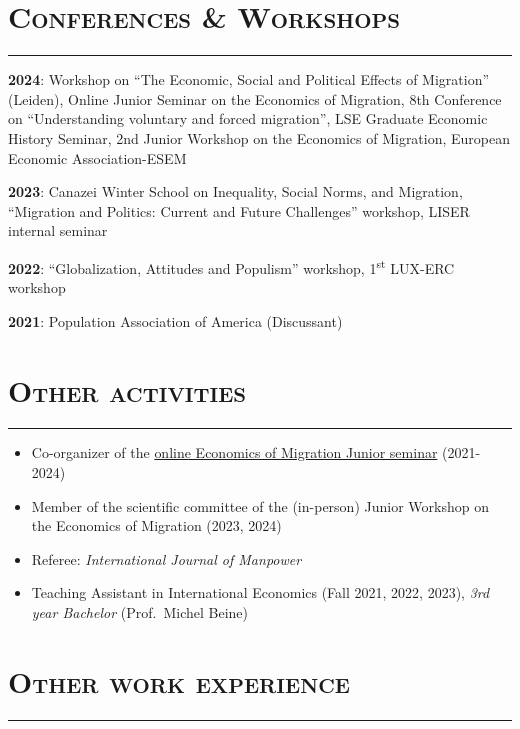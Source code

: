 \documentclass{article}
\newcommand{\sectionline}{%
  \vspace{-0.6cm}%
  \par\noindent\rule{\textwidth}{0.4pt}%
}
\let\xsection=\section
\renewcommand{\section}[1]{%
  \vspace{0.1cm}%
  \xsection*{\scshape{#1}}%
  \sectionline%
}
\begin{document}
\hypertarget{conferences-workshops}{%
\section{Conferences \& Workshops}\label{conferences-workshops}}

\textbf{2024}: Workshop on ``The Economic, Social and Political Effects of Migration'' (Leiden), Online Junior Seminar on the Economics of Migration, 8th Conference on ``Understanding voluntary and forced migration'', LSE Graduate Economic History Seminar, 2nd Junior Workshop on the Economics of Migration, European Economic Association-ESEM 

\textbf{2023}: Canazei Winter School on Inequality, Social Norms, and
Migration, ``Migration and Politics: Current and Future Challenges''
workshop, LISER internal seminar

\textbf{2022}: ``Globalization, Attitudes and Populism'' workshop,
1\textsuperscript{st} LUX-ERC workshop

\textbf{2021}: Population Association of America (Discussant)

\hypertarget{relevant-activities}{%
\section{Other activities}\label{relevant-activities}}

\begin{itemize}

\item
  Co-organizer of the
  \href{https://sites.google.com/view/the-economics-of-migration}{online
  Economics of Migration Junior seminar} (2021-2024)
\item
  Member of the scientific committee of the (in-person) Junior Workshop
  on the Economics of Migration (2023, 2024)
\item Referee: \emph{International Journal of Manpower}
\item
  Teaching Assistant in International Economics (Fall 2021, 2022, 2023), \emph{3rd year
  Bachelor} (Prof.~Michel Beine)
\end{itemize}

\hypertarget{relevant-work-experience}{%
\section{Other work experience}\label{relevant-work-experience}}
\end{document}

